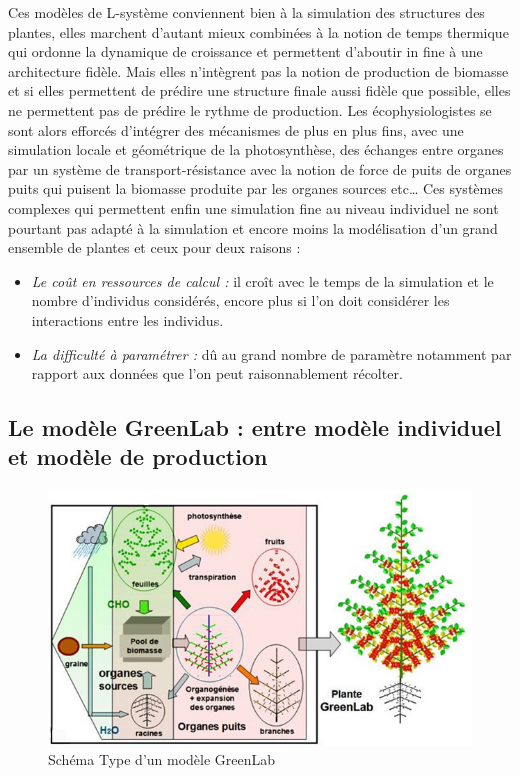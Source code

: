 Ces modèles de L-système conviennent bien à la simulation des structures des plantes, elles marchent d’autant mieux combinées à la notion de temps thermique qui ordonne la dynamique de croissance et permettent d’aboutir in fine à une architecture fidèle. Mais elles n’intègrent pas la notion de production de biomasse et si elles permettent de prédire une structure finale aussi fidèle que possible, elles ne permettent pas de prédire le rythme de production. Les écophysiologistes se sont alors efforcés d’intégrer des mécanismes de plus en plus fins, avec une simulation locale et géométrique de la photosynthèse, des échanges entre organes par un système de transport-résistance avec la notion de force de puits de organes puits qui puisent la biomasse produite par les organes sources etc… Ces systèmes complexes qui permettent enfin une simulation fine au niveau individuel ne sont pourtant pas adapté à la simulation et encore moins la modélisation d’un grand ensemble de plantes et ceux pour deux raisons : 
\begin{itemize}
\item \emph{Le coût en ressources de calcul :} il croît avec le temps de la simulation et le nombre d’individus considérés, encore plus si l’on doit considérer les interactions entre les individus.
\item \emph{La difficulté à paramétrer :} dû au grand nombre de paramètre notamment par rapport aux données que l’on peut raisonnablement récolter.
\end{itemize}

\subsection{Le modèle GreenLab : entre modèle individuel et modèle de production}

\begin{figure}[h]
	\begin{center}
	
	
  \includegraphics[scale=1.0]{./img/sGL.jpg}
  \caption{Schéma Type d'un modèle GreenLab}
  \label{fig:schémaGL}
  
  \end{center}
\end{figure}


